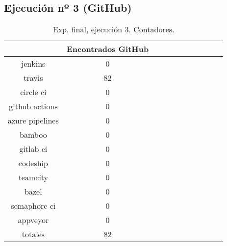 \begin{table}[h]
\begin{footnotesize}
\begin{tabular}{ccccccccccc}
 \end{tabular}
\end{footnotesize}

\end{table}

\subsection{Ejecución nº 3 (GitHub)}
\begin{table}[h]
  \centering
  \caption{Exp. final, ejecución 3. Contadores.}
  \label{tab:tabla_f3_1}

\begin{footnotesize}
\renewcommand{\arraystretch}{1.5} %
\begin{tabular}{ccccccccccc}
  \hline
  {} &  Encontrados GitHub \\
  \hline
  jenkins         &                   0 \\
  travis          &                  82 \\
  circle ci       &                   0 \\
  github actions  &                   0 \\
  azure pipelines &                   0 \\
  bamboo          &                   0 \\
  gitlab ci       &                   0 \\
  codeship        &                   0 \\
  teamcity        &                   0 \\
  bazel           &                   0 \\
  semaphore ci    &                   0 \\
  appveyor        &                   0 \\
  totales         &                  82 \\
 \end{tabular}
\end{footnotesize}

\end{table}

